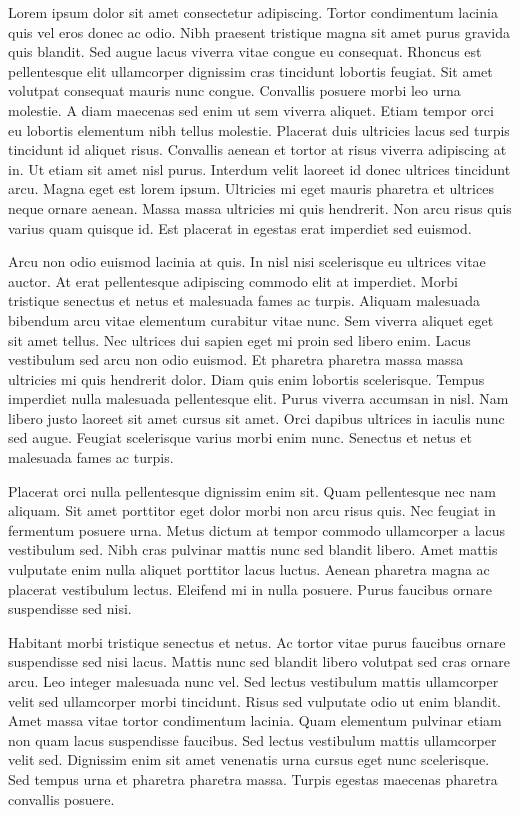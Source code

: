 \documentclass[conference]{IEEEtran}
\begin{document}
Lorem ipsum dolor sit amet consectetur adipiscing. Tortor condimentum lacinia quis vel eros donec ac odio. Nibh praesent tristique magna sit amet purus gravida quis blandit. Sed augue lacus viverra vitae congue eu consequat. Rhoncus est pellentesque elit ullamcorper dignissim cras tincidunt lobortis feugiat. Sit amet volutpat consequat mauris nunc congue. Convallis posuere morbi leo urna molestie. A diam maecenas sed enim ut sem viverra aliquet. Etiam tempor orci eu lobortis elementum nibh tellus molestie. Placerat duis ultricies lacus sed turpis tincidunt id aliquet risus. Convallis aenean et tortor at risus viverra adipiscing at in. Ut etiam sit amet nisl purus. Interdum velit laoreet id donec ultrices tincidunt arcu. Magna eget est lorem ipsum. Ultricies mi eget mauris pharetra et ultrices neque ornare aenean. Massa massa ultricies mi quis hendrerit. Non arcu risus quis varius quam quisque id. Est placerat in egestas erat imperdiet sed euismod.

Arcu non odio euismod lacinia at quis. In nisl nisi scelerisque eu ultrices vitae auctor. At erat pellentesque adipiscing commodo elit at imperdiet. Morbi tristique senectus et netus et malesuada fames ac turpis. Aliquam malesuada bibendum arcu vitae elementum curabitur vitae nunc. Sem viverra aliquet eget sit amet tellus. Nec ultrices dui sapien eget mi proin sed libero enim. Lacus vestibulum sed arcu non odio euismod. Et pharetra pharetra massa massa ultricies mi quis hendrerit dolor. Diam quis enim lobortis scelerisque. Tempus imperdiet nulla malesuada pellentesque elit. Purus viverra accumsan in nisl. Nam libero justo laoreet sit amet cursus sit amet. Orci dapibus ultrices in iaculis nunc sed augue. Feugiat scelerisque varius morbi enim nunc. Senectus et netus et malesuada fames ac turpis.

Placerat orci nulla pellentesque dignissim enim sit. Quam pellentesque nec nam aliquam. Sit amet porttitor eget dolor morbi non arcu risus quis. Nec feugiat in fermentum posuere urna. Metus dictum at tempor commodo ullamcorper a lacus vestibulum sed. Nibh cras pulvinar mattis nunc sed blandit libero. Amet mattis vulputate enim nulla aliquet porttitor lacus luctus. Aenean pharetra magna ac placerat vestibulum lectus. Eleifend mi in nulla posuere. Purus faucibus ornare suspendisse sed nisi.

Habitant morbi tristique senectus et netus. Ac tortor vitae purus faucibus ornare suspendisse sed nisi lacus. Mattis nunc sed blandit libero volutpat sed cras ornare arcu. Leo integer malesuada nunc vel. Sed lectus vestibulum mattis ullamcorper velit sed ullamcorper morbi tincidunt. Risus sed vulputate odio ut enim blandit. Amet massa vitae tortor condimentum lacinia. Quam elementum pulvinar etiam non quam lacus suspendisse faucibus. Sed lectus vestibulum mattis ullamcorper velit sed. Dignissim enim sit amet venenatis urna cursus eget nunc scelerisque. Sed tempus urna et pharetra pharetra massa. Turpis egestas maecenas pharetra convallis posuere.
\end{document}
